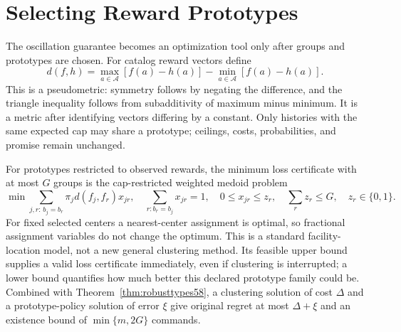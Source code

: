 \section{Selecting Reward Prototypes}\label{sec:grouping59}
The oscillation guarantee becomes an optimization tool only after groups and prototypes are chosen. For catalog reward vectors define
\[
 d(f,h)=\max_{a\in\mathcal A}[f(a)-h(a)]-\min_{a\in\mathcal A}[f(a)-h(a)].
\]
This is a pseudometric: symmetry follows by negating the difference, and the triangle inequality follows from subadditivity of maximum minus minimum. It is a metric after identifying vectors differing by a constant. Only histories with the same expected cap may share a prototype; ceilings, costs, probabilities, and promise remain unchanged.

For prototypes restricted to observed rewards, the minimum loss certificate with at most $G$ groups is the cap-restricted weighted medoid problem
\[
 \min\sum_{j,r:\,b_j=b_r}\pi_jd(f_j,f_r)x_{jr},\quad
 \sum_{r:b_r=b_j}x_{jr}=1,\quad 0\leq x_{jr}\leq z_r,\quad
 \sum_r z_r\leq G,\quad z_r\in\{0,1\}.
\]
For fixed selected centers a nearest-center assignment is optimal, so fractional assignment variables do not change the optimum. This is a standard facility-location model, not a new general clustering method. Its feasible upper bound supplies a valid loss certificate immediately, even if clustering is interrupted; a lower bound quantifies how much better this declared prototype family could be. Combined with Theorem~\ref{thm:robusttypes58}, a clustering solution of cost $\Delta$ and a prototype-policy solution of error $\xi$ give original regret at most $\Delta+\xi$ and an existence bound of $\min\{m,2G\}$ commands.

